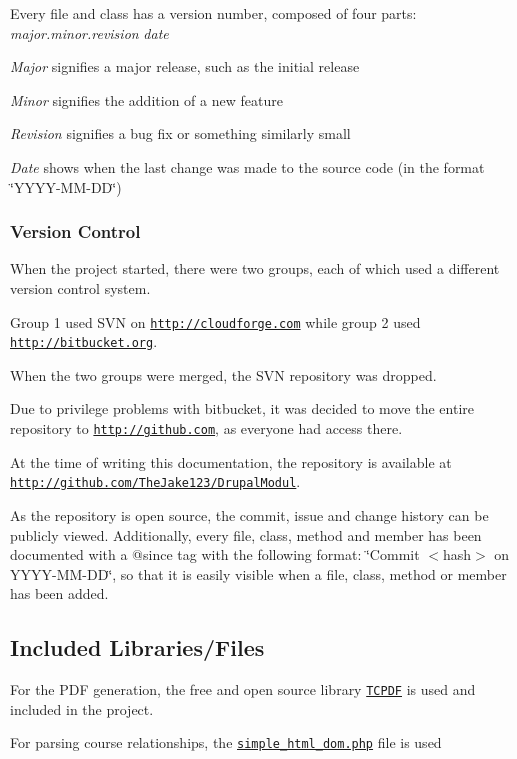 Every file and class has a version number, composed of four parts\+: {\itshape major.\+minor.\+revision} {\itshape date} 
\begin{DoxyItemize}
\item {\itshape Major} signifies a major release, such as the initial release
\item {\itshape Minor} signifies the addition of a new feature
\item {\itshape Revision} signifies a bug fix or something similarly small
\item {\itshape Date} shows when the last change was made to the source code (in the format \char`\"{}\+Y\+Y\+Y\+Y-\/\+M\+M-\/\+D\+D\char`\"{})
\end{DoxyItemize}\hypertarget{index_versioncontrol}{}\subsubsection{Version Control}\label{index_versioncontrol}

\begin{DoxyItemize}
\item When the project started, there were two groups, each of which used a different version control system.
\item Group 1 used S\+V\+N on \href{http://cloudforge.com}{\tt http\+://cloudforge.\+com} while group 2 used \href{http://bitbucket.org}{\tt http\+://bitbucket.\+org}.
\item When the two groups were merged, the S\+V\+N repository was dropped.
\item Due to privilege problems with bitbucket, it was decided to move the entire repository to \href{http://github.com}{\tt http\+://github.\+com}, as everyone had access there.
\item At the time of writing this documentation, the repository is available at \href{http://github.com/TheJake123/DrupalModul}{\tt http\+://github.\+com/\+The\+Jake123/\+Drupal\+Modul}.
\end{DoxyItemize}

As the repository is open source, the commit, issue and change history can be publicly viewed. Additionally, every file, class, method and member has been documented with a {\ttfamily @since} tag with the following format\+: \char`\"{}\+Commit $<$hash$>$ on Y\+Y\+Y\+Y-\/\+M\+M-\/\+D\+D\char`\"{}, so that it is easily visible when a file, class, method or member has been added.\hypertarget{index_Included}{}\subsection{Included Libraries/\+Files}\label{index_Included}
For the P\+D\+F generation, the free and open source library \href{http://www.tcpdf.org/}{\tt T\+C\+P\+D\+F} is used and included in the project.

For parsing course relationships, the \href{http://simplehtmldom.sourceforge.net/}{\tt simple\+\_\+html\+\_\+dom.\+php} file is used 